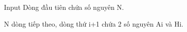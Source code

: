 Input
Dòng đầu tiên chứa số nguyên N.  

   N dòng tiếp theo, dòng thứ i+1 chứa 2 số nguyên Ai và Hi.